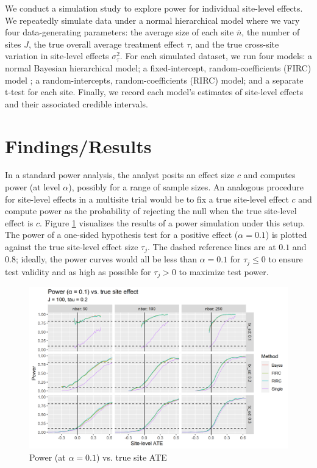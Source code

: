\documentclass[]{article}
\begin{document}
We conduct a simulation study to explore power for individual site-level effects. 
We repeatedly simulate data under a normal hierarchical model where we vary four data-generating parameters: the average size of each site $\bar{n}$, the number of sites $J$, the true overall average treatment effect $\tau$, and the true cross-site variation in site-level effects $\sigma^2_\tau$.
For each simulated dataset, we run four models: a normal Bayesian hierarchical model; a fixed-intercept, random-coefficients (FIRC) model \citep{bloom2017using}; a random-intercepts, random-coefficients (RIRC) model; and a separate t-test for each site. Finally, we record each model’s estimates of site-level effects and their associated credible intervals.

\section{Findings/Results}

In a standard power analysis, the analyst posits an effect size $c$ and computes power (at level $\alpha$), possibly for a range of sample sizes.
An analogous procedure for site-level effects in a multisite trial would be to fix a true site-level effect $c$ and compute power as the probability of rejecting the null when the true site-level effect is $c$.
Figure \ref{fig:power_plot} visualizes the results of a power simulation under this setup.
The power of a one-sided hypothesis test for a positive effect ($\alpha = 0.1$) is plotted against the true site-level effect size $\tau_j$.
The dashed reference lines are at $0.1$ and $0.8$; 
ideally, the power curves would all be less than $\alpha = 0.1$ for $\tau_j \leq 0$ to ensure test validity and as high as possible for $\tau_j > 0$ to maximize test power.
\begin{figure}[ht]
	\centering
	\includegraphics[width=\textwidth]{power_plot_J100}
	\caption{Power (at $\alpha = 0.1$) vs. true site ATE}
	\label{fig:power_plot}
\end{figure}
\end{document}
